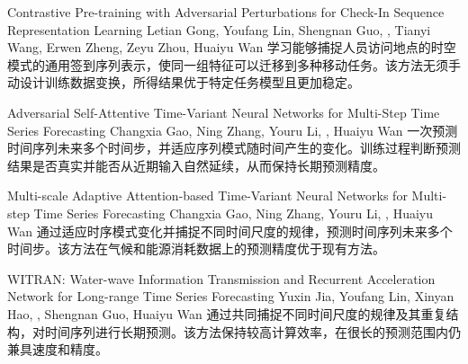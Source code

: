 {Contrastive Pre-training with Adversarial Perturbations for Check-In Sequence Representation Learning}
{Letian Gong, Youfang Lin, Shengnan Guo, \me, Tianyi Wang, Erwen Zheng, Zeyu Zhou, Huaiyu Wan}
{学习能够捕捉人员访问地点的时空模式的通用签到序列表示，使同一组特征可以迁移到多种移动任务。该方法无须手动设计训练数据变换，所得结果优于特定任务模型且更加稳定。}

{Adversarial Self-Attentive Time-Variant Neural Networks for Multi-Step Time Series Forecasting}
{Changxia Gao, Ning Zhang, Youru Li, \me, Huaiyu Wan}
{一次预测时间序列未来多个时间步，并适应序列模式随时间产生的变化。训练过程判断预测结果是否真实并能否从近期输入自然延续，从而保持长期预测精度。}

{Multi-scale Adaptive Attention-based Time-Variant Neural Networks for Multi-step Time Series Forecasting}
{Changxia Gao, Ning Zhang, Youru Li, \me, Huaiyu Wan}
{通过适应时序模式变化并捕捉不同时间尺度的规律，预测时间序列未来多个时间步。该方法在气候和能源消耗数据上的预测精度优于现有方法。}

{WITRAN: Water-wave Information Transmission and Recurrent Acceleration Network for Long-range Time Series Forecasting}
{Yuxin Jia, Youfang Lin, Xinyan Hao, \me, Shengnan Guo, Huaiyu Wan}
{通过共同捕捉不同时间尺度的规律及其重复结构，对时间序列进行长期预测。该方法保持较高计算效率，在很长的预测范围内仍兼具速度和精度。}
